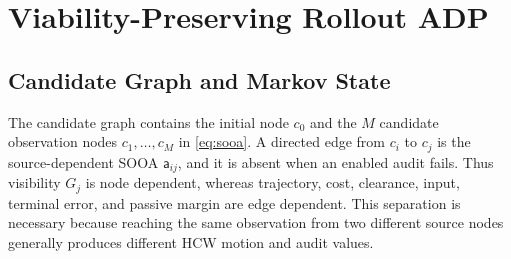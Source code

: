 \documentclass{IEEEtaes}
\begin{document}
\section{Viability-Preserving Rollout ADP}
\label{sec:algorithm}

\subsection{Candidate Graph and Markov State}

The candidate graph contains the initial node $c_0$ and the $M$ candidate observation nodes $c_1,\ldots,c_M$ in \eqref{eq:sooa}. A directed edge from $c_i$ to $c_j$ is the source-dependent SOOA $\mathsf a_{ij}$, and it is absent when an enabled audit fails. Thus visibility $G_j$ is node dependent, whereas trajectory, cost, clearance, input, terminal error, and passive margin are edge dependent. This separation is necessary because reaching the same observation from two different source nodes generally produces different HCW motion and audit values.
\end{document}
